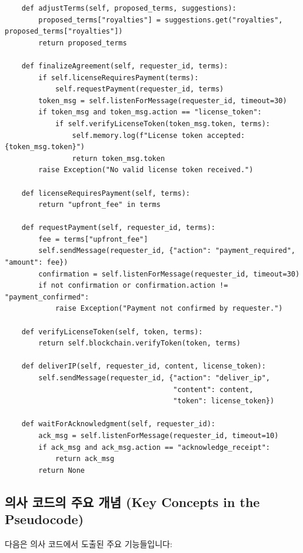 \documentclass[journal,onecolumn]{IEEEtran} %
\begin{document}
\begin{lstlisting}
    def adjustTerms(self, proposed_terms, suggestions):
        proposed_terms["royalties"] = suggestions.get("royalties", proposed_terms["royalties"])
        return proposed_terms

    def finalizeAgreement(self, requester_id, terms):
        if self.licenseRequiresPayment(terms):
            self.requestPayment(requester_id, terms)
        token_msg = self.listenForMessage(requester_id, timeout=30)
        if token_msg and token_msg.action == "license_token":
            if self.verifyLicenseToken(token_msg.token, terms):
                self.memory.log(f"License token accepted: {token_msg.token}")
                return token_msg.token
        raise Exception("No valid license token received.")

    def licenseRequiresPayment(self, terms):
        return "upfront_fee" in terms

    def requestPayment(self, requester_id, terms):
        fee = terms["upfront_fee"]
        self.sendMessage(requester_id, {"action": "payment_required", "amount": fee})
        confirmation = self.listenForMessage(requester_id, timeout=30)
        if not confirmation or confirmation.action != "payment_confirmed":
            raise Exception("Payment not confirmed by requester.")

    def verifyLicenseToken(self, token, terms):
        return self.blockchain.verifyToken(token, terms)

    def deliverIP(self, requester_id, content, license_token):
        self.sendMessage(requester_id, {"action": "deliver_ip",
                                        "content": content,
                                        "token": license_token})

    def waitForAcknowledgment(self, requester_id):
        ack_msg = self.listenForMessage(requester_id, timeout=10)
        if ack_msg and ack_msg.action == "acknowledge_receipt":
            return ack_msg
        return None
\end{lstlisting}

\subsection{의사 코드의 주요 개념 (Key Concepts in the Pseudocode)}

다음은 의사 코드에서 도출된 주요 기능들입니다:
\end{document}
